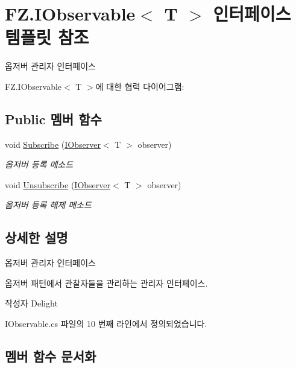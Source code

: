 \hypertarget{interface_f_z_1_1_i_observable}{}\section{F\+Z.\+I\+Observable$<$ T $>$ 인터페이스 템플릿 참조}
\label{interface_f_z_1_1_i_observable}


옵저버 관리자 인터페이스  




F\+Z.\+I\+Observable$<$ T $>$에 대한 협력 다이어그램\+:
\subsection*{Public 멤버 함수}
\begin{DoxyCompactItemize}
\item 
void \hyperlink{interface_f_z_1_1_i_observable_a9d81fb0fd7c697a9e78cf0ac8ce4d233}{Subscribe} (\hyperlink{interface_f_z_1_1_i_observer}{I\+Observer}$<$ T $>$ observer)
\begin{DoxyCompactList}\small\item\em 옵저버 등록 메소드 \end{DoxyCompactList}\item 
void \hyperlink{interface_f_z_1_1_i_observable_a52b72c2bdfb0fe164945d7fe74cec386}{Unsubscribe} (\hyperlink{interface_f_z_1_1_i_observer}{I\+Observer}$<$ T $>$ observer)
\begin{DoxyCompactList}\small\item\em 옵저버 등록 해제 메소드 \end{DoxyCompactList}\end{DoxyCompactItemize}


\subsection{상세한 설명}
옵저버 관리자 인터페이스 

옵저버 패턴에서 관찰자들을 관리하는 관리자 인터페이스. \begin{DoxyAuthor}{작성자}
Delight 
\end{DoxyAuthor}


I\+Observable.\+cs 파일의 10 번째 라인에서 정의되었습니다.



\subsection{멤버 함수 문서화}
